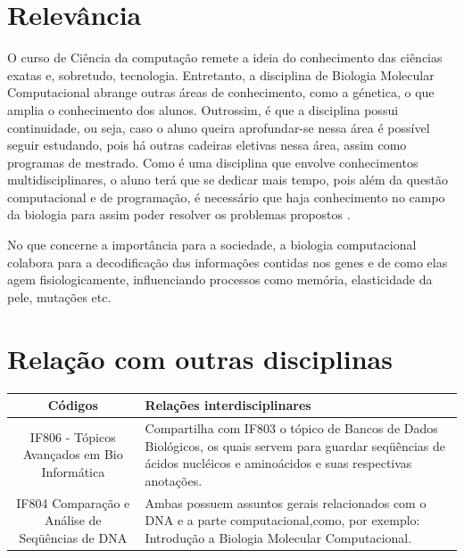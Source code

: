 \documentclass[10pt]{article}
\begin{document}
\section{Relevância}
\qquad O curso de Ciência da computação remete a ideia do conhecimento das ciências exatas e, sobretudo, tecnologia. Entretanto, a disciplina de Biologia Molecular Computacional abrange outras áreas de conhecimento, como a génetica, o que amplia o conhecimento dos alunos. Outrossim, é que a disciplina possui continuidade, ou seja, caso o aluno queira aprofundar-se nessa área é possível seguir estudando, pois há outras cadeiras eletivas nessa área, assim como programas de mestrado. Como é uma disciplina que envolve conhecimentos multidisciplinares, o aluno terá que se dedicar mais tempo, pois além da questão computacional e de programação, é necessário que haja conhecimento no campo da biologia para assim poder resolver os problemas propostos . 

No que concerne a importância para a sociedade, a biologia computacional colabora para a decodificação das informações contidas nos genes e de como elas agem fisiologicamente, influenciando processos como memória, elasticidade da pele, mutações etc.\cite{importancia}


\section{Relação com outras disciplinas}

\begin{right}
\begin{tabular}{|c|p{3.5cm}|}
\hline

Códigos & Relações interdisciplinares \\ \hline
IF806 - Tópicos Avançados em Bio Informática &
Compartilha com IF803 o tópico de Bancos de Dados Biológicos, os quais servem para guardar seqüências de ácidos nucléicos e aminoácidos e suas respectivas anotações.\cite{IF806}
 \\ \hline
IF804 Comparação e Análise de Seqüências de DNA  & 
Ambas possuem  assuntos gerais relacionados com o DNA e a parte computacional,como, por exemplo: Introdução a Biologia Molecular Computacional. \cite{IF804}
\\ \hline

\end{tabular}    
\end{right}



\end{document}

